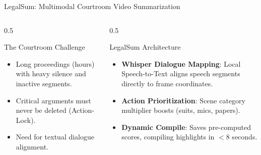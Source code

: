 \documentclass[aspectratio=169]{beamer}
\begin{document}
\begin{frame}{LegalSum: Multimodal Courtroom Video Summarization}
    \begin{columns}
        \begin{column}{0.5\textwidth}
            \begin{block}{The Courtroom Challenge}
                \begin{itemize}
                    \item Long proceedings (hours) with heavy silence and inactive segments.
                    \item Critical arguments must never be deleted (Action-Lock).
                    \item Need for textual dialogue alignment.
                \end{itemize}
            \end{block}
        \end{column}
        \begin{column}{0.5\textwidth}
            \begin{block}{LegalSum Architecture}
                \begin{itemize}
                    \item \textbf{Whisper Dialogue Mapping}: Local Speech-to-Text aligns speech segments directly to frame coordinates.
                    \item \textbf{Action Prioritization}: Scene category multiplier boosts (suits, mics, papers).
                    \item \textbf{Dynamic Compile}: Saves pre-computed scores, compiling highlights in $<8$ seconds.
                \end{itemize}
            \end{block}
        \end{column}
    \end{columns}
\end{frame}
\end{document}
